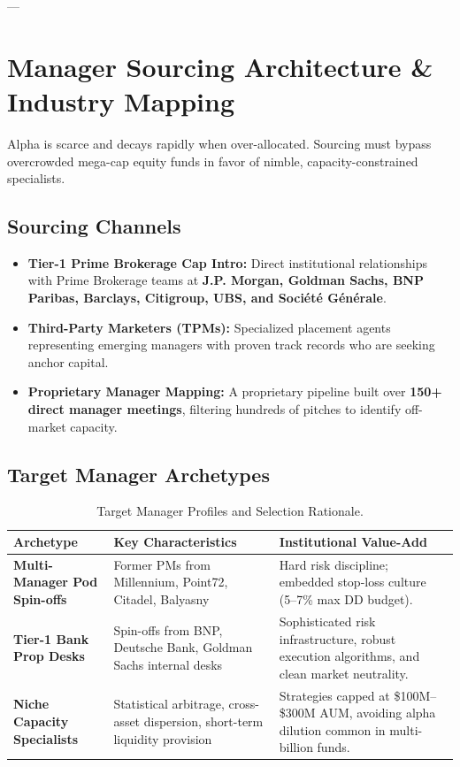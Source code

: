 \documentclass[11pt,a4paper]{article}
\begin{document}
---

\section{Manager Sourcing Architecture \& Industry Mapping}

Alpha is scarce and decays rapidly when over-allocated. Sourcing must bypass overcrowded mega-cap equity funds in favor of nimble, capacity-constrained specialists.

\subsection{Sourcing Channels}
\begin{itemize}[leftmargin=1.5em, itemsep=0.3em]
    \item \textbf{Tier-1 Prime Brokerage Cap Intro:} Direct institutional relationships with Prime Brokerage teams at \textbf{J.P. Morgan, Goldman Sachs, BNP Paribas, Barclays, Citigroup, UBS, and Société Générale}.
    \item \textbf{Third-Party Marketers (TPMs):} Specialized placement agents representing emerging managers with proven track records who are seeking anchor capital.
    \item \textbf{Proprietary Manager Mapping:} A proprietary pipeline built over \textbf{150+ direct manager meetings}, filtering hundreds of pitches to identify off-market capacity.
\end{itemize}

\subsection{Target Manager Archetypes}

\begin{table}[htbp]
\centering
\small
\renewcommand{\arraystretch}{1.3}
\begin{tabularx}{\textwidth}{p{3.8cm} p{5.5cm} p{5.5cm}}
\toprule
\textbf{Archetype} & \textbf{Key Characteristics} & \textbf{Institutional Value-Add} \\
\midrule
\textbf{Multi-Manager Pod Spin-offs} & Former PMs from Millennium, Point72, Citadel, Balyasny & Hard risk discipline; embedded stop-loss culture (5--7\% max DD budget). \\
\addlinespace
\textbf{Tier-1 Bank Prop Desks} & Spin-offs from BNP, Deutsche Bank, Goldman Sachs internal desks & Sophisticated risk infrastructure, robust execution algorithms, and clean market neutrality. \\
\addlinespace
\textbf{Niche Capacity Specialists} & Statistical arbitrage, cross-asset dispersion, short-term liquidity provision & Strategies capped at \$100M--\$300M AUM, avoiding alpha dilution common in multi-billion funds. \\
\bottomrule
\end{tabularx}
\caption{Target Manager Profiles and Selection Rationale.}
\label{tab:manager_profiles}
\end{table}
\end{document}
